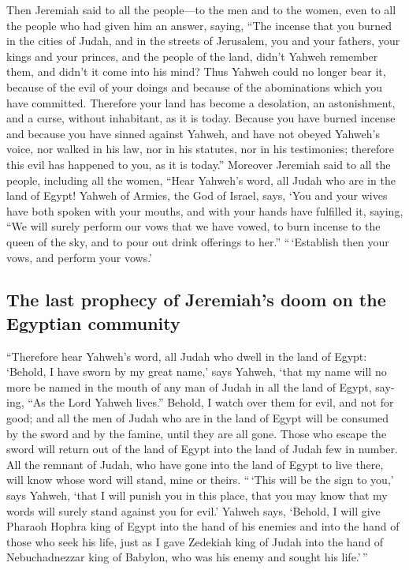 \begin{paracol}{2}
\begin{otherlanguage}{english}
 Then Jeremiah said to all the people---to the men and to
the women, even to all the people who had given him an answer, saying,
 ``The incense that you burned in the cities of Judah,
and in the streets of Jerusalem, you and your fathers, your kings and
your princes, and the people of the land, didn't Yahweh remember them,
and didn't it come into his mind?  Thus Yahweh could no
longer bear it, because of the evil of your doings and because of the
abominations which you have committed. Therefore your land has become a
desolation, an astonishment, and a curse, without inhabitant, as it is
today.  Because you have burned incense and because you
have sinned against Yahweh, and have not obeyed Yahweh's voice, nor
walked in his law, nor in his statutes, nor in his testimonies;
therefore this evil has happened to you, as it is today.''
 Moreover Jeremiah said to all the people, including all
the women, ``Hear Yahweh's word, all Judah who are in the land of Egypt!
 Yahweh of Armies, the God of Israel, says, `You and your
wives have both spoken with your mouths, and with your hands have
fulfilled it, saying, ``We will surely perform our vows that we have
vowed, to burn incense to the queen of the sky, and to pour out drink
offerings to her.'' ``\,`Establish then your vows, and perform your
vows.'

\hypertarget{the-last-prophecy-of-jeremiahs-doom-on-the-egyptian-community}{%
\subsection{The last prophecy of Jeremiah's doom on the Egyptian
community}\label{the-last-prophecy-of-jeremiahs-doom-on-the-egyptian-community}}

 ``Therefore hear Yahweh's word, all Judah who dwell in
the land of Egypt: `Behold, I have sworn by my great name,' says Yahweh,
`that my name will no more be named in the mouth of any man of Judah in
all the land of Egypt, saying, ``As the Lord Yahweh lives.''
 Behold, I watch over them for evil, and not for good;
and all the men of Judah who are in the land of Egypt will be consumed
by the sword and by the famine, until they are all gone. 
Those who escape the sword will return out of the land of Egypt into the
land of Judah few in number. All the remnant of Judah, who have gone
into the land of Egypt to live there, will know whose word will stand,
mine or theirs.  ``\,`This will be the sign to you,' says
Yahweh, `that I will punish you in this place, that you may know that my
words will surely stand against you for evil.'  Yahweh
says, `Behold, I will give Pharaoh Hophra king of Egypt into the hand of
his enemies and into the hand of those who seek his life, just as I gave
Zedekiah king of Judah into the hand of Nebuchadnezzar king of Babylon,
who was his enemy and sought his life.'\,''


\end{otherlanguage}
\end{paracol}
